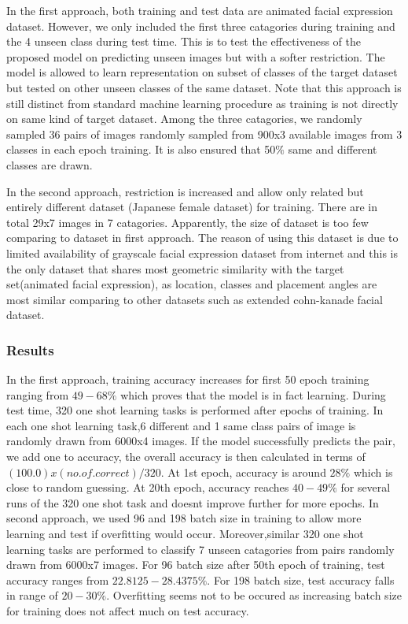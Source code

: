 \documentclass{article}
\begin{document}
In the first approach, both training and test data are animated facial expression dataset. However, we only included the first three catagories during training and the 4 unseen class during test time. This is to test the effectiveness of the proposed model on predicting unseen images but with a softer restriction. The model is allowed to learn representation on subset of classes of the target dataset but tested on other unseen classes of the same dataset. Note that this approach is still distinct from standard machine learning procedure as training is not directly on same kind of target dataset. Among the three catagories, we randomly sampled 36 pairs of images randomly sampled from 900x3 available images from 3 classes in each epoch training. It is also ensured that 50$\%$ same and different classes are drawn.

In the second approach, restriction is increased and allow only related but entirely different dataset (Japanese female dataset) for training. There are in total 29x7 images in 7 catagories. Apparently, the size of dataset is too few comparing to dataset in first approach. The reason of using this dataset is due to limited availability of grayscale facial expression dataset from internet and this is the only dataset that shares most geometric similarity with the target set(animated facial expression), as location, classes and placement angles are most similar comparing to other datasets such as extended cohn-kanade facial dataset.

\subsubsection{\textbf{Results}}

In the first approach, training accuracy increases for first 50 epoch training ranging from $49-68\%$ which proves that the model is in fact learning. During test time, 320 one shot learning tasks is performed after epochs of training. In each one shot learning task,6 different and 1 same class pairs of image is randomly drawn from 6000x4 images. If the model successfully predicts the pair, we add one to accuracy, the overall accuracy is then calculated in terms of $(100.0)x( no.of.correct )/ 320$. At 1st epoch, accuracy is around $28\%$ which is close to random guessing. At 20th epoch, accuracy reaches $40-49\%$ for several runs of the 320 one shot task and doesnt improve further for more epochs. In second approach, we used 96 and 198 batch size in training to allow more learning and test if overfitting would occur. Moreover,similar 320 one shot learning tasks are performed to classify 7 unseen catagories from pairs randomly drawn from 6000x7 images. For 96 batch size after 50th epoch of training, test accuracy ranges from $22.8125-28.4375\%$. For 198 batch size, test accuracy falls in range of $20-30\%$. Overfitting seems not to be occured as increasing batch size for training does not affect much on test accuracy.
\end{document}
